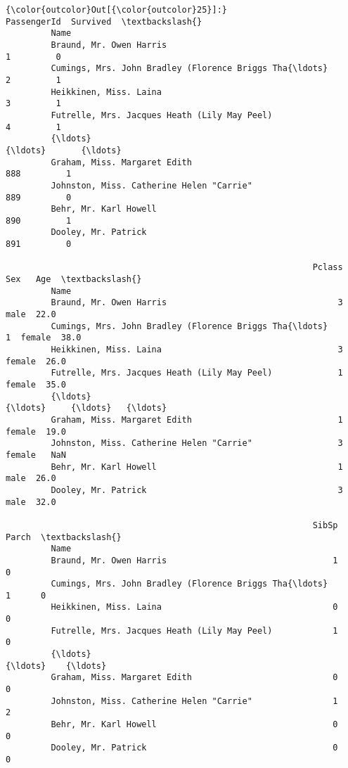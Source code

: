 \documentclass[11pt]{article}
\begin{document}
\begin{Verbatim}[commandchars=\\\{\}]
{\color{outcolor}Out[{\color{outcolor}25}]:}                                                     PassengerId  Survived  \textbackslash{}
         Name                                                                        
         Braund, Mr. Owen Harris                                       1         0   
         Cumings, Mrs. John Bradley (Florence Briggs Tha{\ldots}            2         1   
         Heikkinen, Miss. Laina                                        3         1   
         Futrelle, Mrs. Jacques Heath (Lily May Peel)                  4         1   
         {\ldots}                                                         {\ldots}       {\ldots}   
         Graham, Miss. Margaret Edith                                888         1   
         Johnston, Miss. Catherine Helen "Carrie"                    889         0   
         Behr, Mr. Karl Howell                                       890         1   
         Dooley, Mr. Patrick                                         891         0   
         
                                                             Pclass     Sex   Age  \textbackslash{}
         Name                                                                       
         Braund, Mr. Owen Harris                                  3    male  22.0   
         Cumings, Mrs. John Bradley (Florence Briggs Tha{\ldots}       1  female  38.0   
         Heikkinen, Miss. Laina                                   3  female  26.0   
         Futrelle, Mrs. Jacques Heath (Lily May Peel)             1  female  35.0   
         {\ldots}                                                    {\ldots}     {\ldots}   {\ldots}   
         Graham, Miss. Margaret Edith                             1  female  19.0   
         Johnston, Miss. Catherine Helen "Carrie"                 3  female   NaN   
         Behr, Mr. Karl Howell                                    1    male  26.0   
         Dooley, Mr. Patrick                                      3    male  32.0   
         
                                                             SibSp  Parch  \textbackslash{}
         Name                                                               
         Braund, Mr. Owen Harris                                 1      0   
         Cumings, Mrs. John Bradley (Florence Briggs Tha{\ldots}      1      0   
         Heikkinen, Miss. Laina                                  0      0   
         Futrelle, Mrs. Jacques Heath (Lily May Peel)            1      0   
         {\ldots}                                                   {\ldots}    {\ldots}   
         Graham, Miss. Margaret Edith                            0      0   
         Johnston, Miss. Catherine Helen "Carrie"                1      2   
         Behr, Mr. Karl Howell                                   0      0   
         Dooley, Mr. Patrick                                     0      0   
         

\end{Verbatim}
\end{document}
